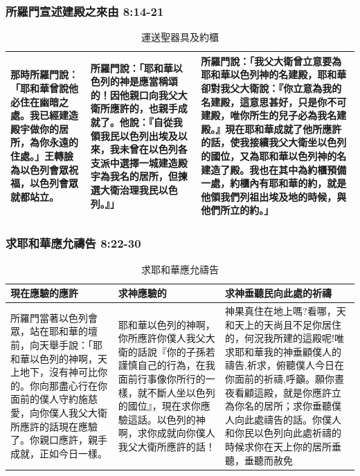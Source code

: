 \subsubsection{所羅門宣述建殿之來由 8:14-21}
\begin{table}[H]
\centering 
\begin{tabular}{p{3.3cm}|p{5.1cm}|p{8.75cm}}\hline\hline
那時所羅門說：「耶和華曾說他必住在幽暗之處。我已經建造殿宇做你的居所，為你永遠的住處。」王轉臉為以色列會眾祝福，以色列會眾就都站立。
&所羅門說：「耶和華以色列的神是應當稱頌的！因他親口向我父大衛所應許的，也親手成就了。他說：『自從我領我民以色列出埃及以來，我未曾在以色列各支派中選擇一城建造殿宇為我名的居所，但揀選大衛治理我民以色列。』」&所羅門說：「我父大衛曾立意要為耶和華以色列神的名建殿，耶和華卻對我父大衛說：『你立意為我的名建殿，這意思甚好，只是你不可建殿，唯你所生的兒子必為我名建殿。』現在耶和華成就了他所應許的話，使我接續我父大衛坐以色列的國位，又為耶和華以色列神的名建造了殿。我也在其中為約櫃預備一處，約櫃內有耶和華的約，就是他領我們列祖出埃及地的時候，與他們所立的約。」\\\hline
\end{tabular}
\caption{運送聖器具及約櫃}
\end{table}

\subsubsection{求耶和華應允禱告 8:22-30}
\begin{table}[H]
\vspace{-5mm}
\centering 
\begin{tabular}{p{5.3cm}|p{5.1cm}|p{7.2cm}}\hline\hline
現在應驗的應許&求神應驗的&求神垂聽民向此處的祈禱\\\hline
所羅門當著以色列會眾，站在耶和華的壇前，向天舉手說：「耶和華以色列的神啊，天上地下，沒有神可比你的。你向那盡心行在你面前的僕人守約施慈愛，向你僕人我父大衛所應許的話現在應驗了。你親口應許，親手成就，正如今日一樣。
&耶和華以色列的神啊，你所應許你僕人我父大衛的話說『你的子孫若謹慎自己的行為，在我面前行事像你所行的一樣，就不斷人坐以色列的國位』，現在求你應驗這話。以色列的神啊，求你成就向你僕人我父大衛所應許的話！
&神果真住在地上嗎?看哪，天和天上的天尚且不足你居住的，何況我所建的這殿呢!唯求耶和華我的神垂顧僕人的禱告,祈求，俯聽僕人今日在你面前的祈禱,呼籲。願你晝夜看顧這殿，就是你應許立為你名的居所；求你垂聽僕人向此處禱告的話。你僕人和你民以色列向此處祈禱的時候求你在天上你的居所垂聽，垂聽而赦免\\\hline
\end{tabular}
\caption{求耶和華應允禱告}
\end{table}




